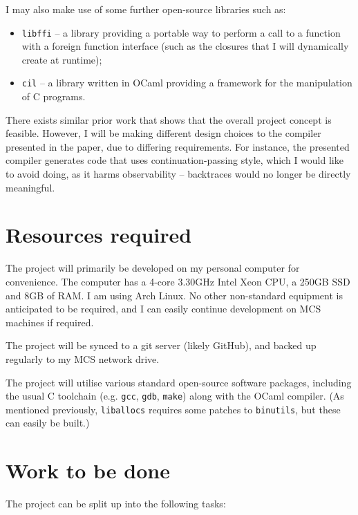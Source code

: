\documentclass[12pt,twoside,a4paper]{article}
\begin{document}
I may also make use of some further open-source libraries such as:
\begin{itemize}
  \item \lstinline{libffi} -- a library providing a portable way to perform a call to a function
with a foreign function interface (such as the closures that I will dynamically
create at runtime);
  \item \lstinline{cil} -- a library written in OCaml providing a framework for the manipulation of C programs.
\end{itemize}

There exists similar prior work \cite{tarditi90} that shows that the overall project concept is feasible. However, I will be making different design choices to the compiler presented in the paper, due to
differing requirements. For instance, the presented compiler
generates code that uses continuation-passing style, which I would like to
avoid doing, as it harms observability -- backtraces would no longer be directly
meaningful.


\section*{Resources required}

The project will primarily be developed on my personal computer
for convenience. The computer has a 4-core 3.30GHz Intel Xeon
CPU, a 250GB SSD and 8GB of RAM. I am using Arch Linux. No other non-standard equipment
is anticipated to be required, and I can easily continue development on
MCS machines if required.

The project will be synced to a git server (likely GitHub), and backed up
regularly to my MCS network drive.

The project will utilise various standard open-source software packages,
including the usual C toolchain (e.g. \lstinline{gcc}, \lstinline{gdb}, \lstinline{make}) along with
the OCaml compiler. (As mentioned previously, \lstinline{liballocs} requires
some patches to \lstinline{binutils}, but these can easily be built.)

\section*{Work to be done}

The project can be split up into the following tasks:
\end{document}
